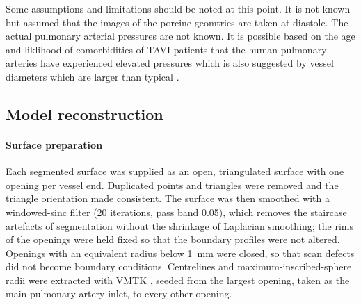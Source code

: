 
Some assumptions and limitations should be noted at this point.
It is not known but assumed that the images of the porcine geomtries are taken at diastole.
The actual pulmonary arterial pressures are not known.
It is possible based on the age and liklihood of comorbidities of TAVI patients that the human pulmonary arteries have experienced elevated pressures which is also suggested by vessel diameters which are larger than typical \citep{ganNoninvasivelyAssessedPulmonary2007}.


\subsection{Model reconstruction}\label{sec:Meshing}

\paragraph{Surface preparation}
Each segmented surface was supplied as an open, triangulated surface with one opening per vessel end.
Duplicated points and triangles were removed and the triangle orientation made consistent.
The surface was then smoothed with a windowed-sinc filter \citep{taubin1996optimal} (20 iterations, pass band 0.05), which removes the staircase artefacts of segmentation without the shrinkage of Laplacian smoothing; the rims of the openings were held fixed so that the boundary profiles were not altered.
Openings with an equivalent radius below \SI{1}{\milli\metre} were closed, so that scan defects did not become boundary conditions.
Centrelines and maximum-inscribed-sphere radii were extracted with VMTK \citep{antiga2008image}, seeded from the largest opening, taken as the main pulmonary artery inlet, to every other opening.

